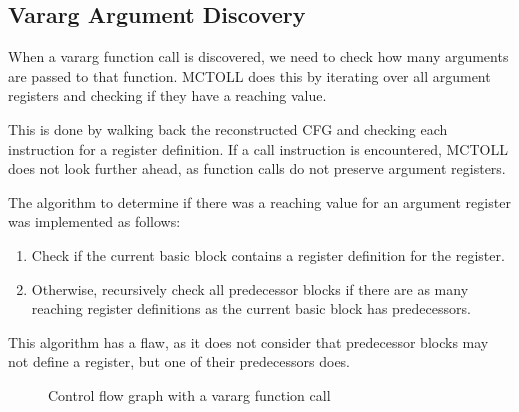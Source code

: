 \subsection{Vararg Argument Discovery}\label{subsec:vararg-argument-discovery}

When a vararg function call is discovered, we need to check how many arguments are passed to that function.
MCTOLL does this by iterating over all argument registers and checking if they have a reaching value.

This is done by walking back the reconstructed CFG and checking each instruction for a register definition.
If a call instruction is encountered, MCTOLL does not look further ahead, as function calls do not preserve argument registers.

The algorithm to determine if there was a reaching value for an argument register was implemented as follows:

\begin{enumerate}
    \item Check if the current basic block contains a register definition for the register.
    \item Otherwise, recursively check all predecessor blocks if there are as many reaching register definitions as the current basic block has predecessors.
\end{enumerate}

This algorithm has a flaw, as it does not consider that predecessor blocks may not define a register, but one of their predecessors does.

\begin{figure}[htpb]
    \centering
    \caption{Control flow graph with a vararg function call}
    \label{fig:discovered-vararg-reg}
\end{figure}

